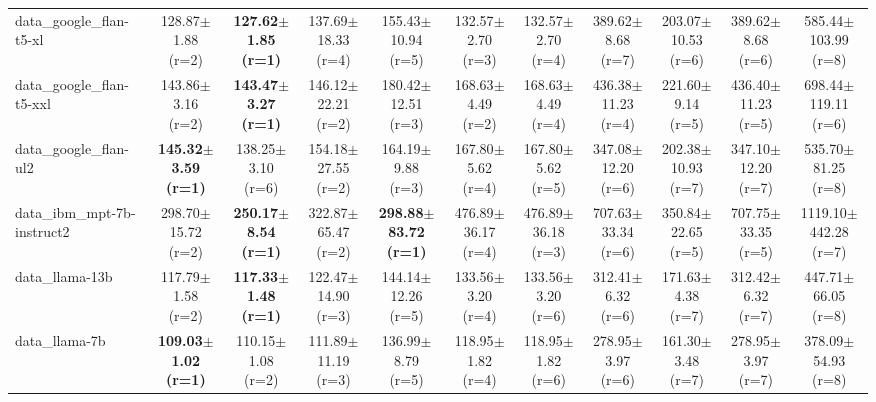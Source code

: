 \begin{table}[t]
\begin{tabular}{lcccccccccc}
data\_google\_flan-t5-xl & 128.87$\pm$1.88 {\scriptsize (r=2)} & \cellcolor{red!15}\textbf{127.62$\pm$1.85 {\scriptsize (r=1)}} & 137.69$\pm$18.33 {\scriptsize (r=4)} & 155.43$\pm$10.94 {\scriptsize (r=5)} & 132.57$\pm$2.70 {\scriptsize (r=3)} & 132.57$\pm$2.70 {\scriptsize (r=4)} & 389.62$\pm$8.68 {\scriptsize (r=7)} & 203.07$\pm$10.53 {\scriptsize (r=6)} & 389.62$\pm$8.68 {\scriptsize (r=6)} & 585.44$\pm$103.99 {\scriptsize (r=8)} \\
data\_google\_flan-t5-xxl & 143.86$\pm$3.16 {\scriptsize (r=2)} & \cellcolor{red!15}\textbf{143.47$\pm$3.27 {\scriptsize (r=1)}} & 146.12$\pm$22.21 {\scriptsize (r=2)} & 180.42$\pm$12.51 {\scriptsize (r=3)} & 168.63$\pm$4.49 {\scriptsize (r=2)} & 168.63$\pm$4.49 {\scriptsize (r=4)} & 436.38$\pm$11.23 {\scriptsize (r=4)} & 221.60$\pm$9.14 {\scriptsize (r=5)} & 436.40$\pm$11.23 {\scriptsize (r=5)} & 698.44$\pm$119.11 {\scriptsize (r=6)} \\
data\_google\_flan-ul2 & \cellcolor{red!15}\textbf{145.32$\pm$3.59 {\scriptsize (r=1)}} & 138.25$\pm$3.10 {\scriptsize (r=6)} & 154.18$\pm$27.55 {\scriptsize (r=2)} & 164.19$\pm$9.88 {\scriptsize (r=3)} & 167.80$\pm$5.62 {\scriptsize (r=4)} & 167.80$\pm$5.62 {\scriptsize (r=5)} & 347.08$\pm$12.20 {\scriptsize (r=6)} & 202.38$\pm$10.93 {\scriptsize (r=7)} & 347.10$\pm$12.20 {\scriptsize (r=7)} & 535.70$\pm$81.25 {\scriptsize (r=8)} \\
data\_ibm\_mpt-7b-instruct2 & 298.70$\pm$15.72 {\scriptsize (r=2)} & \cellcolor{red!15}\textbf{250.17$\pm$8.54 {\scriptsize (r=1)}} & 322.87$\pm$65.47 {\scriptsize (r=2)} & \cellcolor{red!15}\textbf{298.88$\pm$83.72 {\scriptsize (r=1)}} & 476.89$\pm$36.17 {\scriptsize (r=4)} & 476.89$\pm$36.18 {\scriptsize (r=3)} & 707.63$\pm$33.34 {\scriptsize (r=6)} & 350.84$\pm$22.65 {\scriptsize (r=5)} & 707.75$\pm$33.35 {\scriptsize (r=5)} & 1119.10$\pm$442.28 {\scriptsize (r=7)} \\
data\_llama-13b & 117.79$\pm$1.58 {\scriptsize (r=2)} & \cellcolor{red!15}\textbf{117.33$\pm$1.48 {\scriptsize (r=1)}} & 122.47$\pm$14.90 {\scriptsize (r=3)} & 144.14$\pm$12.26 {\scriptsize (r=5)} & 133.56$\pm$3.20 {\scriptsize (r=4)} & 133.56$\pm$3.20 {\scriptsize (r=6)} & 312.41$\pm$6.32 {\scriptsize (r=6)} & 171.63$\pm$4.38 {\scriptsize (r=7)} & 312.42$\pm$6.32 {\scriptsize (r=7)} & 447.71$\pm$66.05 {\scriptsize (r=8)} \\
data\_llama-7b & \cellcolor{red!15}\textbf{109.03$\pm$1.02 {\scriptsize (r=1)}} & 110.15$\pm$1.08 {\scriptsize (r=2)} & 111.89$\pm$11.19 {\scriptsize (r=3)} & 136.99$\pm$8.79 {\scriptsize (r=5)} & 118.95$\pm$1.82 {\scriptsize (r=4)} & 118.95$\pm$1.82 {\scriptsize (r=6)} & 278.95$\pm$3.97 {\scriptsize (r=6)} & 161.30$\pm$3.48 {\scriptsize (r=7)} & 278.95$\pm$3.97 {\scriptsize (r=7)} & 378.09$\pm$54.93 {\scriptsize (r=8)} \\
\bottomrule
\end{tabular}
\end{table}